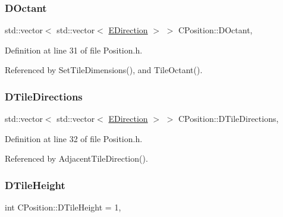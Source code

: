 \hypertarget{classCPosition_a0f7a420e82a180b983e32258729bb984}{}\label{classCPosition_a0f7a420e82a180b983e32258729bb984} 
\subsubsection{\texorpdfstring{D\+Octant}{DOctant}}
{\footnotesize\ttfamily std\+::vector$<$ std\+::vector$<$ \hyperlink{GameDataTypes_8h_acb2b033915f6659a71a38b5aa6e4eb42}{E\+Direction} $>$ $>$ C\+Position\+::\+D\+Octant\hspace{0.3cm}{\ttfamily [static]}, {\ttfamily [protected]}}



Definition at line 31 of file Position.\+h.



Referenced by Set\+Tile\+Dimensions(), and Tile\+Octant().

\hypertarget{classCPosition_ab4bc566d2d14d378cfdf6b1d2d3f522e}{}\label{classCPosition_ab4bc566d2d14d378cfdf6b1d2d3f522e} 
\subsubsection{\texorpdfstring{D\+Tile\+Directions}{DTileDirections}}
{\footnotesize\ttfamily std\+::vector$<$ std\+::vector$<$ \hyperlink{GameDataTypes_8h_acb2b033915f6659a71a38b5aa6e4eb42}{E\+Direction} $>$ $>$ C\+Position\+::\+D\+Tile\+Directions\hspace{0.3cm}{\ttfamily [static]}, {\ttfamily [protected]}}



Definition at line 32 of file Position.\+h.



Referenced by Adjacent\+Tile\+Direction().

\hypertarget{classCPosition_a202ebb83e86df75cfb76cf1241ba817c}{}\label{classCPosition_a202ebb83e86df75cfb76cf1241ba817c} 
\subsubsection{\texorpdfstring{D\+Tile\+Height}{DTileHeight}}
{\footnotesize\ttfamily int C\+Position\+::\+D\+Tile\+Height = 1\hspace{0.3cm}{\ttfamily [static]}, {\ttfamily [protected]}}



